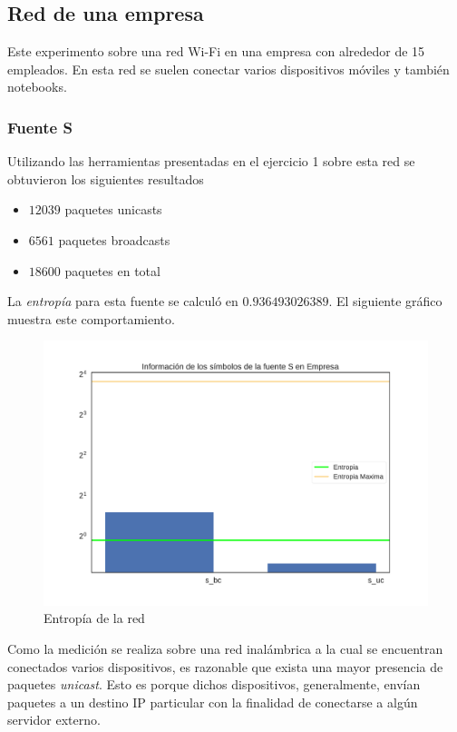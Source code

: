 
\subsection{Red de una empresa}
Este experimento sobre una red Wi-Fi en una empresa con alrededor de 15 empleados. En esta red se suelen conectar varios dispositivos móviles y también notebooks.

\subsubsection{Fuente S}

Utilizando las herramientas presentadas en el ejercicio 1 sobre esta red se obtuvieron los siguientes resultados
\begin{itemize}
 \item $12039$ paquetes unicasts
 \item $6561$ paquetes broadcasts
 \item $18600$ paquetes en total
\end{itemize}

 La \emph{entropía} para esta fuente se calculó en  $0.936493026389$. El siguiente gráfico muestra este comportamiento. \par


\begin{figure}[H]
   \centering
       \includegraphics[page=1,width=.70\textwidth]{../img/barras-Empresa}
 \caption{Entropía de la red}
 \label{fig:Test}
\end{figure}





 Como la medición se realiza sobre una red inalámbrica a la cual se encuentran conectados varios dispositivos, es razonable que exista una mayor presencia de paquetes \emph{unicast}. Esto es porque dichos dispositivos, generalmente, envían paquetes a un destino IP particular con la finalidad de conectarse a algún servidor externo. \par


